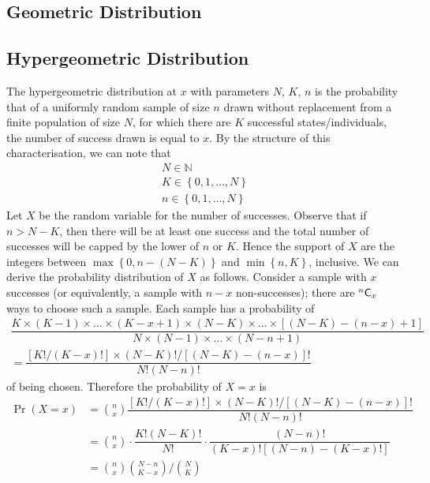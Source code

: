 \documentclass[11pt]{report} %
\begin{document}
\subsection{Geometric Distribution}

\subsection{Hypergeometric Distribution}

The hypergeometric distribution at $x$ with parameters $N$, $K$, $n$ is the probability that of a uniformly random sample of size $n$ drawn without replacement from a finite population of size $N$, for which there are $K$ successful states/individuals, the number of success drawn is equal to $x$. By the structure of this characterisation, we can note that
\begin{gather}
N \in \mathbb{N} \\
K \in \left\{0, 1, \dots, N\right\} \\
n \in \left\{0, 1, \dots, N\right\}
\end{gather}
Let $X$ be the random variable for the number of successes. Observe that if $n > N - K$, then there will be at least one success and the total number of successes will be capped by the lower of $n$ or $K$. Hence the support of $X$ are the integers between $\max\left\{0, n - \left(N - K\right)\right\}$ and $\min\left\{n, K\right\}$, inclusive. We can derive the probability distribution of $X$ as follows. Consider a sample with $x$ successes (or equivalently, a sample with $n - x$ non-successes); there are $\mathstrut^{n}\mathsf{C}_{x}$ ways to choose such a sample. Each sample has a probability of
\begin{multline}
\dfrac{K\times\left(K - 1\right)\times\dots\times\left(K - x + 1\right)\times \left(N - K\right)\times\dots\times\left[\left(N - K\right) - \left(n - x\right) + 1\right]}{N\times\left(N - 1\right)\times\dots\times\left(N - n + 1\right)} \\
= \dfrac{\left[K!/\left(K - x\right)!\right]\times\left(N - K\right)!/\left[\left(N - K\right) - \left(n - x\right)\right]!}{N!\left(N - n\right)!}
\end{multline}
of being chosen. Therefore the probability of $X = x$ is
\begin{align}
\operatorname{Pr}\left(X = x\right) &= \binom{n}{x}\dfrac{\left[K!/\left(K - x\right)!\right]\times\left(N - K\right)!/\left[\left(N - K\right) - \left(n - x\right)\right]!}{N!\left(N - n\right)!} \\
&= \binom{n}{x}\cdot\dfrac{K!\left(N - K\right)!}{N!}\cdot\dfrac{\left(N - n\right)!}{\left(K - x\right)!\left[\left(N - n\right) - \left(K - x\right)!\right]} \\
&= \binom{n}{x}\binom{N - n}{K - x}/\binom{N}{K}
\end{align}
\end{document}
